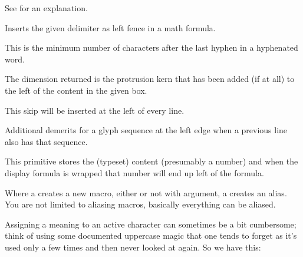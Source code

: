 \stopoldprimitive

\startoldprimitive[title={\prm {leaders}}]

See  for an explanation.

\stopoldprimitive

\startoldprimitive[title={\prm {left}}]

Inserts the given delimiter as left fence in a math formula.

\stopoldprimitive

\startoldprimitive[title={\prm {lefthyphenmin}}]

This is the minimum number of characters after the last hyphen in a hyphenated
word.

\stopoldprimitive

\startnewprimitive[title={\prm {leftmarginkern}}]

The dimension returned is the protrusion kern that has been added (if at all)
to the left of the content in the given box.

\stopnewprimitive

\startoldprimitive[title={\prm {leftskip}}]

This skip will be inserted at the left of every line.

\stopoldprimitive

\startnewprimitive[title={\prm {lefttwindemerits}}]

Additional demerits for a glyph sequence at the left edge when a previous line
also has that sequence.

\stopnewprimitive

\startoldprimitive[title={\prm {leqno}}]

This primitive stores the (typeset) content (presumably a number) and when the
display formula is wrapped that number will end up left of the formula.

\stopoldprimitive

\startoldprimitive[title={\prm {let}}]

Where a  creates a new macro, either or not with argument, a 
creates an alias. You are not limited to aliasing macros, basically everything
can be aliased.

\stopoldprimitive

\startnewprimitive[title={\prm {letcharcode}}]

Assigning a meaning to an active character can sometimes be a bit cumbersome;
think of using some documented uppercase magic that one tends to forget as it's
used only a few times and then never looked at again. So we have this:

